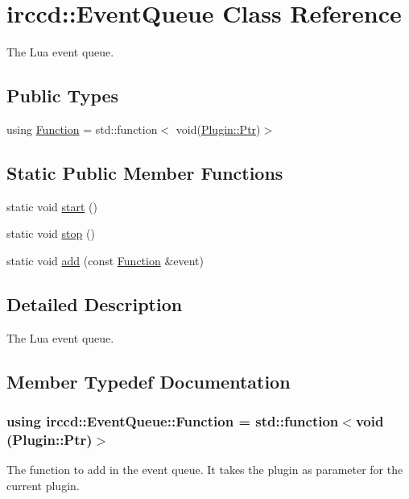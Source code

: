 \hypertarget{a00028}{\section{irccd\-:\-:Event\-Queue Class Reference}
\label{a00028}
}


The Lua event queue.  


\subsection*{Public Types}
\begin{DoxyCompactItemize}
\item 
using \hyperlink{a00028_ab31495de33d66a15dd3fd99c2e6cf4b7}{Function} = std\-::function$<$ void(\hyperlink{a00051_ad981ef3d4a7cd70da4fffb792abcfd7c}{Plugin\-::\-Ptr})$>$
\end{DoxyCompactItemize}
\subsection*{Static Public Member Functions}
\begin{DoxyCompactItemize}
\item 
static void \hyperlink{a00028_a130a14805c661902a1178ff17899b249}{start} ()
\item 
static void \hyperlink{a00028_a77726270d06bfbb4ed2f81c92041ef20}{stop} ()
\item 
static void \hyperlink{a00028_adefcf917fd55de0ce6c915369f547d63}{add} (const \hyperlink{a00028_ab31495de33d66a15dd3fd99c2e6cf4b7}{Function} \&event)
\end{DoxyCompactItemize}


\subsection{Detailed Description}
The Lua event queue. 

\subsection{Member Typedef Documentation}
\hypertarget{a00028_ab31495de33d66a15dd3fd99c2e6cf4b7}{
\subsubsection[{Function}]{\setlength{\rightskip}{0pt plus 5cm}using {\bf irccd\-::\-Event\-Queue\-::\-Function} =  std\-::function$<$void ({\bf Plugin\-::\-Ptr})$>$}}\label{a00028_ab31495de33d66a15dd3fd99c2e6cf4b7}
The function to add in the event queue. It takes the plugin as parameter for the current plugin. 


